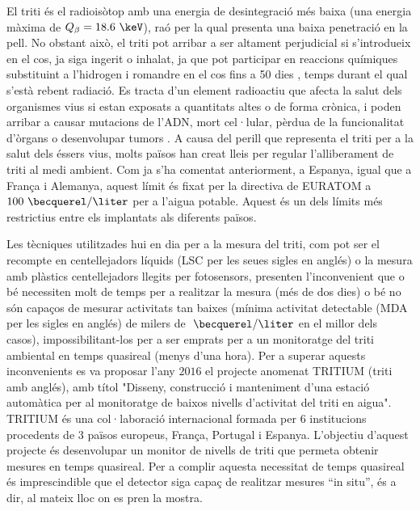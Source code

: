 El triti és el radioisòtop amb una energia de desintegració més baixa (una energia màxima de $Q_\beta=18.6~\keV$), raó per la qual presenta una baixa penetració en la pell. No obstant això, el triti pot arribar a ser altament perjudicial si s'introdueix en el cos, ja siga ingerit o inhalat, ja que pot participar en reaccions químiques substituint a l'hidrogen i romandre en el cos fins a 50 dies \cite{EstimationTritiumDosiKangarooRats, TissueDistribution}, temps durant el qual s'està rebent radiació. Es tracta d'un element radioactiu que afecta la salut dels organismes vius si estan exposats a quantitats altes o de forma crònica, i poden arribar a causar mutacions de l'ADN, mort cel·lular, pèrdua de la funcionalitat d'òrgans o desenvolupar tumors \cite{StraumeTritiumHazard}. A causa del perill que representa el triti per a la salut dels éssers vius, molts països han creat lleis per regular l'alliberament de triti al medi ambient. Com ja s'ha comentat anteriorment, a Espanya, igual que a França i Alemanya, aquest límit és fixat per la directiva de EURATOM a $100~\becquerel/\liter$ per a l'aigua potable. Aquest és un dels límits més restrictius entre els implantats als diferents països.

Les tècniques utilitzades hui en dia per a la mesura del triti, com pot ser el recompte en centellejadors líquids (LSC per les seues sigles en anglés) o la mesura amb plàstics centellejadors llegits per fotosensors, presenten l'inconvenient que o bé necessiten molt de temps per a realitzar la mesura (més de dos dies) o bé no són capaços de mesurar activitats tan baixes (mínima activitat detectable (MDA per les sigles en anglés) de milers de $~\becquerel/\liter$ en el millor dels casos), impossibilitant-los per a ser emprats per a un monitoratge del triti ambiental en temps quasireal (menys d'una hora). Per a superar aquests inconvenients es va proposar l'any $2016$ el projecte anomenat TRITIUM (triti amb anglés), amb títol "Disseny, construcció i manteniment d'una estació automàtica per al monitoratge de baixos nivells d'activitat del triti en aigua". TRITIUM és una col·laboració internacional formada per $6$ institucions procedents de $3$ països europeus, França, Portugal i Espanya. L'objectiu d'aquest projecte és desenvolupar un monitor de nivells de triti que permeta obtenir mesures en temps quasireal. Per a complir aquesta necessitat de temps quasireal és imprescindible que el detector siga capaç de realitzar mesures ``in situ'', és a dir, al mateix lloc on es pren la mostra.

